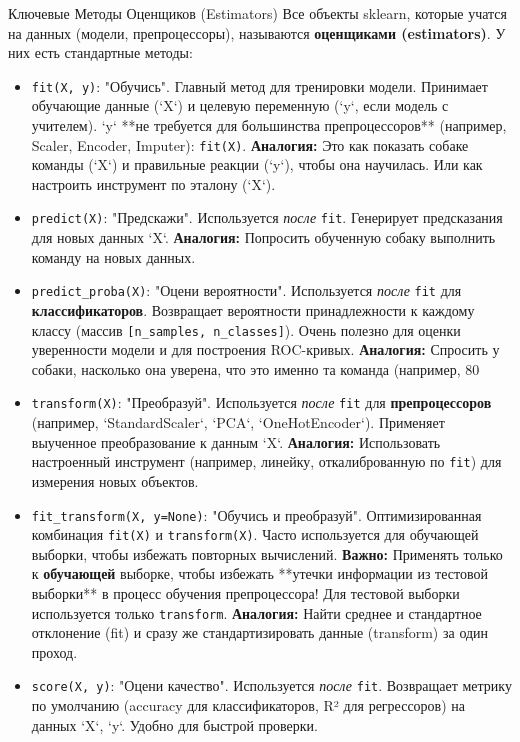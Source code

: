 \begin{textbox}{Ключевые Методы Оценщиков (Estimators)}
    Все объекты sklearn, которые учатся на данных (модели, препроцессоры), называются \textbf{оценщиками (estimators)}. У них есть стандартные методы:
    \begin{itemize}
        \item \texttt{fit(X, y)}: "Обучись". Главный метод для тренировки модели. Принимает обучающие данные (`X`) и целевую переменную (`y`, если модель с учителем). `y` **не требуется для большинства препроцессоров** (например, Scaler, Encoder, Imputer): \texttt{fit(X)}. \textbf{Аналогия:} Это как показать собаке команды (`X`) и правильные реакции (`y`), чтобы она научилась. Или как настроить инструмент по эталону (`X`).
        \item \texttt{predict(X)}: "Предскажи". Используется \textit{после} \texttt{fit}. Генерирует предсказания для новых данных `X`. \textbf{Аналогия:} Попросить обученную собаку выполнить команду на новых данных.
        \item \texttt{predict\_proba(X)}: "Оцени вероятности". Используется \textit{после} \texttt{fit} для \textbf{классификаторов}. Возвращает вероятности принадлежности к каждому классу (массив \texttt{[n\_samples, n\_classes]}). Очень полезно для оценки уверенности модели и для построения ROC-кривых. \textbf{Аналогия:} Спросить у собаки, насколько она уверена, что это именно та команда (например, 80%
        \item \texttt{transform(X)}: "Преобразуй". Используется \textit{после} \texttt{fit} для \textbf{препроцессоров} (например, `StandardScaler`, `PCA`, `OneHotEncoder`). Применяет выученное преобразование к данным `X`. \textbf{Аналогия:} Использовать настроенный инструмент (например, линейку, откалиброванную по \texttt{fit}) для измерения новых объектов.
        \item \texttt{fit\_transform(X, y=None)}: "Обучись и преобразуй". Оптимизированная комбинация \texttt{fit(X)} и \texttt{transform(X)}. Часто используется для обучающей выборки, чтобы избежать повторных вычислений. \textbf{Важно:} Применять только к \textbf{обучающей} выборке, чтобы избежать **утечки информации из тестовой выборки** в процесс обучения препроцессора! Для тестовой выборки используется только \texttt{transform}. \textbf{Аналогия:} Найти среднее и стандартное отклонение (fit) и сразу же стандартизировать данные (transform) за один проход.
        \item \texttt{score(X, y)}: "Оцени качество". Используется \textit{после} \texttt{fit}. Возвращает метрику по умолчанию (accuracy для классификаторов, R² для регрессоров) на данных `X`, `y`. Удобно для быстрой проверки.
    \end{itemize}
\end{textbox}

